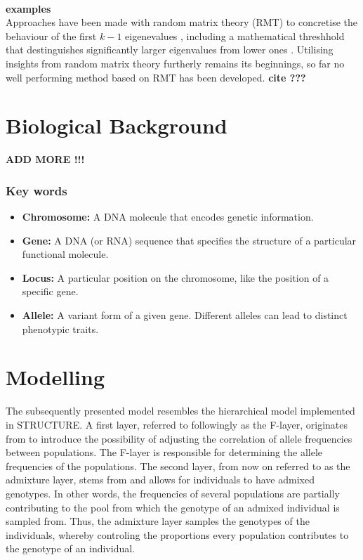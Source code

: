 \documentclass[a4paper, 11pt]{article}
\begin{document}
\\
\textbf{examples}
\\
Approaches have been made with random matrix theory (RMT) to concretise the behaviour of the first $k-1$ eigenevalues \cite{patterson2006population}, including a mathematical threshhold that destinguishes significantly larger eigenvalues from lower ones \cite {bryc2013separation}. Utilising insights from random matrix theory furtherly remains its beginnings, so far no well performing method based on RMT has been developed. \textbf{cite ???}




\section{Biological Background}

\textbf{ADD MORE !!!}

\subsubsection{Key words}

\begin{itemize}
\item \textbf{Chromosome:} A DNA molecule that encodes genetic information.

\item \textbf{Gene:} A DNA (or RNA) sequence that specifies the structure of a particular functional molecule.

\item \textbf{Locus:} A particular position on the chromosome, like the position of a specific gene.

\item \textbf{Allele:} A variant form of a given gene. Different alleles can lead to distinct phenotypic traits.

\end{itemize}

\section{Modelling}
The subsequently presented model resembles the hierarchical model implemented in STRUCTURE. A first layer, referred to followingly as the F-layer, originates from \cite{falush2003inference} to introduce the possibility of adjusting the correlation of allele frequencies between populations. The F-layer is responsible for determining the allele frequencies of the populations. The second layer, from now on referred to as the admixture layer, stems from \cite{pritchard2000inference} and allows for individuals to have admixed genotypes. In other words, the frequencies of several populations are partially contributing to the pool from which the genotype of an admixed individual is sampled from. Thus, the admixture layer samples the genotypes of the individuals, whereby controling the proportions every population contributes to the genotype of an individual.
\end{document}
